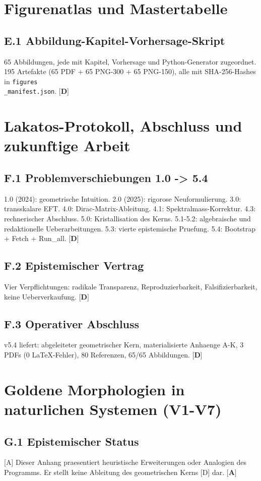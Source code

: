 ﻿\documentclass[11pt,letterpaper]{article}
\begin{document}
\section{Figurenatlas und Mastertabelle}
\subsection{E.1 Abbildung-Kapitel-Vorhersage-Skript}
65 Abbildungen, jede mit Kapitel, Vorhersage und Python-Generator zugeordnet. 195 Artefakte (65 PDF + 65 PNG-300 + 65 PNG-150), alle mit SHA-256-Hashes in \texttt{figures\\\_manifest.json}. $\textbf{[D]}$
\section{Lakatos-Protokoll, Abschluss und zukunftige Arbeit}
\subsection{F.1 Problemverschiebungen 1.0 -> 5.4}
1.0 (2024): geometrische Intuition. 2.0 (2025): rigorose Neuformulierung. 3.0: transskalare EFT. 4.0: Dirac-Matrix-Ableitung. 4.1: Spektralmass-Korrektur. 4.3: rechnerischer Abschluss. 5.0: Kristallisation des Kerns. 5.1-5.2: algebraische und redaktionelle Ueberarbeitungen. 5.3: vierte epistemische Pruefung. 5.4: Bootstrap + Fetch + Run\_all. $\textbf{[D]}$
\subsection{F.2 Epistemischer Vertrag}
Vier Verpflichtungen: radikale Transparenz, Reproduzierbarkeit, Falsifizierbarkeit, keine Ueberverkaufung. $\textbf{[D]}$
\subsection{F.3 Operativer Abschluss}
v5.4 liefert: abgeleiteter geometrischer Kern, materialisierte Anhaenge A-K, 3 PDFs (0 LaTeX-Fehler), 80 Referenzen, 65/65 Abbildungen. $\textbf{[D]}$
\section{Goldene Morphologien in naturlichen Systemen (V1-V7)}
\subsection{G.1 Epistemischer Status}
[A] Dieser Anhang praesentiert heuristische Erweiterungen oder Analogien des Programms. Er stellt keine Ableitung des geometrischen Kerns [D] dar. $\textbf{[A]}$
\end{document}

